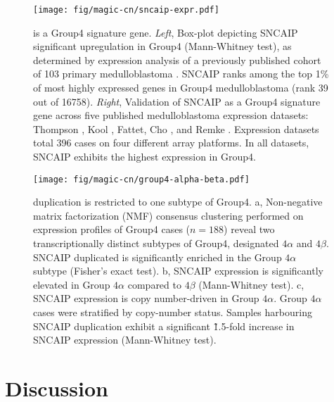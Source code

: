 \begin{figure}[t]
	\begin{center}
		\texttt{[image: fig/magic-cn/sncaip-expr.pdf]}
	\end{center}
	\caption[ is a Group4 signature gene]
	{
	 is a Group4 signature gene.
	\emph{Left}, Box-plot depicting SNCAIP significant upregulation in Group4 (Mann-Whitney test), as determined by expression analysis of a previously published cohort of 103 primary medulloblastoma . SNCAIP ranks among the top 1\% of most highly expressed genes in Group4 medulloblastoma (rank 39 out of 16758).
	\emph{Right}, Validation of SNCAIP as a Group4 signature gene across five published medulloblastoma expression datasets: Thompson , Kool , Fattet, Cho , and Remke . Expression datasets total 396 cases on four different array platforms. In all datasets, SNCAIP exhibits the highest expression in Group4.
	}
	\label{fig:sncaip-expr}
\end{figure}

\begin{figure}[b]
	\begin{center}
		\texttt{[image: fig/magic-cn/group4-alpha-beta.pdf]}
	\end{center}
	\caption[ duplication is restricted to one subtype of Group4]
	{
	 duplication is restricted to one subtype of Group4.
	\textsf{a}, Non-negative matrix factorization (NMF) consensus clustering performed on expression profiles of Group4 cases ($n = 188$) reveal two transcriptionally distinct subtypes of Group4, designated $4\alpha$ and $4\beta$. SNCAIP duplicated is significantly enriched in the Group $4\alpha$ subtype (Fisher's exact test).
	\textsf{b}, SNCAIP expression is significantly elevated in Group $4\alpha$ compared to $4\beta$ (Mann-Whitney test).
	\textsf{c}, SNCAIP expression is copy number-driven in Group $4\alpha$. Group $4\alpha$ cases were stratified by  copy-number status. Samples harbouring SNCAIP duplication exhibit a significant \~1.5-fold increase in SNCAIP expression (Mann-Whitney test).
	}
	\label{fig:group4-alpha-beta}
\end{figure}

\clearpage

\section{Discussion}

